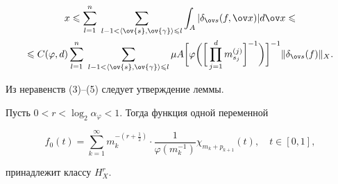\begin{pf}
\begin{multline}
x\leq\sum_{l=1}^{n}\;\sum_{l-1<\la\ov{s},\ov{\gamma}\ra\leq l}


\int_{A}|\delta_{\ov s}(f,\ov x)| d\ov x \leq \\


%


\leq C(\varphi,d) 


\sum_{l=1}^{n}\;\sum_{l-1<\la\ov{s},\ov{\gamma}\ra\leq l}\mu 


A\bigg[\varphi\bigg(\bigg[ 


\prod_{j=1}^{d}m_{s_{j}}^{(j)}\bigg]^{-1}\bigg)\bigg]^{-1}


\|\delta_{\ov s}(f)\|_{X}.


\end{multline}


Из неравенств (3)--(5) следует утверждение леммы.


\end{pf}








\begin{lem}


Пусть $0<r<\log_{2}\alpha_{\varphi}<1$. Тогда функция одной переменной


$$


f_{0}(t)=\sum_{k=1}^{\infty}m_{k}^{-(r+\frac{1}{2})}\cdot 


\frac{1}{\varphi(m_{k}^{-1})}\chi_{m_{k}+p_{k+1}}(t), \quad t\in[0,1],


$$


принадлежит классу $H_{X}^{r}$.


\end{lem}









